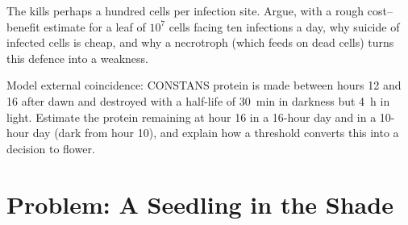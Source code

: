 \begin{exercise}[$\star\star\star$]\label{exo:b3:plant-molecular-physiology:11}
The  kills perhaps a hundred cells per
infection site. Argue, with a rough cost--benefit estimate for a leaf
of $10^{7}$ cells facing ten infections a day, why suicide of infected
cells is cheap, and why a necrotroph (which feeds on dead cells) turns
this defence into a weakness.
\end{exercise}

\begin{exercise}[$\star\star\star$]\label{exo:b3:plant-molecular-physiology:12}
Model external coincidence: CONSTANS protein is made between hours 12
and 16 after dawn and destroyed with a half-life of \qty{30}{min} in
darkness but \qty{4}{h} in light. Estimate the protein remaining at
hour 16 in a 16-hour day and in a 10-hour day (dark from hour 10), and
explain how a threshold converts this into a decision to flower.
\end{exercise}

\section{Problem: A Seedling in the Shade}

